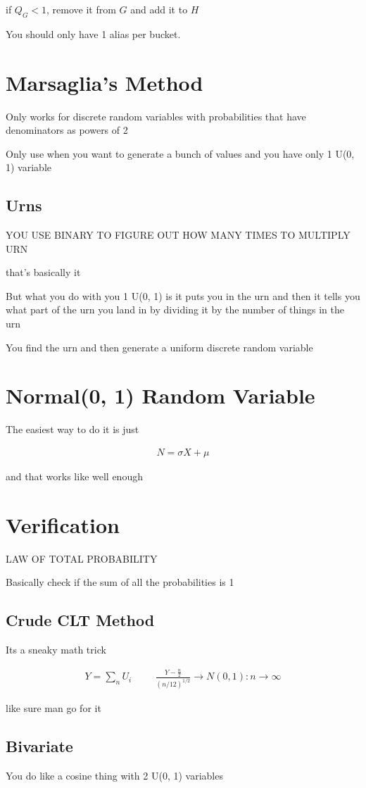 \documentclass[fleqn]{report}
\newcommand{\hp}{\hspace{1cm}}
\newcommand{\equations} [1] {
\begin{gather*}
#1
\end{gather*}
}
\begin{document}
if $Q_{G} < 1$, remove it from $G$ and add it to $H$ 

You should only have 1 alias per bucket.

\section{Marsaglia's Method}
Only works for discrete random variables with probabilities that 
have denominators as powers of 2 

Only use when you want to generate a bunch of values and you have 
only 1 U(0, 1) variable

\subsection{Urns}
YOU USE BINARY TO FIGURE OUT HOW MANY TIMES TO MULTIPLY URN 

that's basically it 

But what you do with you 1 U(0, 1) 
is it puts you in the urn and then it tells you what 
part of the urn you land in by dividing it by the number of things 
in the urn

You find the urn and then generate a uniform discrete random variable

\section{Normal(0, 1) Random Variable}
The easiest way to do it is just 
\equations{
    N = \sigma X + \mu 
}

and that works like well enough

\section{Verification}
LAW OF TOTAL PROBABILITY 

Basically check if the sum of all the probabilities is 1 



\subsection{Crude CLT Method}
Its a sneaky math trick 

\equations{
    Y = \sum_{n} U_i 
    \hp 
    \frac{Y - \frac{n}{2}}{(n / 12)^{1/2}}
    \rightarrow 
    N(0, 1):
    n \to \infty 
}
like sure man go for it 

\subsection{Bivariate}
You do like a cosine thing with 2 U(0, 1) variables 
\end{document}
